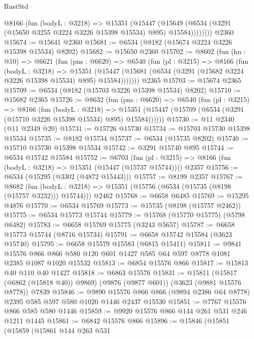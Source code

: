 \begin{lexlean}{RustStd}
\begin{coremodule}
          @8166
            (fun (bodyL : @3218) =>
            @15351
              (@15447
                (@15649 (@6534 (@3291 (@15650 @3255 @3224 @3226 @15398 @15534) @895) @15584))))))))
    @2360
@15674 := @15641 @2360
@15681 := @6534 (@8182 (@15674 @3224 @3226 @15398 @15534) @8202)
@15682 := @15650 @2360
@15702 := @8602
    (fun (hn : @10) =>
    @6621
      (fun (pns : @6620) =>
      @6540
        (fun (pl : @3215) =>
        @8166
          (fun (bodyL : @3218) =>
          @15351
            (@15447 (@15681 (@6534 (@3291 (@15682 @3224 @3226 @15398 @15534) @895) @15584)))))))
    @2365
@15703 := @15674 @2365
@15709 := @6534 (@8182 (@15703 @3226 @15398 @15534) @8202)
@15710 := @15682 @2365
@15726 := @8632
    (fun (pns : @6620) =>
    @6540
      (fun (pl : @3215) =>
      @8166
        (fun (bodyL : @3218) =>
        @15351 (@15447 (@15709 (@6534 (@3291 (@15710 @3226 @15398 @15534) @895) @15584))))))
@15730 := @11 @2340 (@11 @2349 @20)
@15731 := @15726 @15730
@15734 := @15703 @15730 @15398 @15534
@15735 := @8182 @15734
@15737 := @6534 (@15735 @8202)
@15740 := @15710 @15730 @15398 @15534
@15742 := @3291 @15740 @895
@15744 := @6534 @15742 @15584
@15752 := @6703
    (fun (pl : @3215) => @8166 (fun (bodyL : @3218) => @15351 (@15447 (@15737 @15744))))
    @2357
@15756 := @6534 (@15295 (@3302 (@4872 @15443)))
@15757 := @8199 @2357
@15767 := @8682
    (fun (bodyL : @3218) => @15351 (@15756 (@6534 (@15735 (@8198 (@15757 @3232))) @15744)))
    @2462
@15768 := @6658 @6485
@15769 := @15295 @4876
@15770 := @6534 @15769
@15773 := @15735 (@8198 (@15757 @2462))
@15775 := @6534 @15773 @15744
@15779 := @15768 (@15770 @15775) (@5798 @6482)
@15783 := @6658 @15769 @15775 (@3243 @5657)
@15787 := @6658 @15773 @15744 (@8716 @15734)
@15791 := @6658 @15742 @15584 (@3623 @15740)
@15795 := @6658 @15579 @15583 (@6815 @15411)
@15811 := @9841
    @15576
    @866
    @866
    @580
    @120
    @601
    @1427
    @585
    @64
    @597
    @8778
    @1081
    @2385
    @1087
    @1020
    @15532
@15813 := @6854 @15576 @866
@15817 := @15813 @40 @110 @40 @1427
@15818 := @6863 @15576
@15831 := @15811
    (@15817 (@6862 (@15818 @40)) @9869)
    (@9876 (@9877 @601))
    (@3623 (@9881 @15576 @8778))
    @7839
@15846 := @9890
    @15576
    @866
    @866
    (@9894 @2386 @64 @8778)
    @2395
    @585
    @597
    @580
    @1020
    @1446
    @2437
    @15530
@15851 := @7767 @15576 @866 @585 @580 @1446
@15859 := @9920 @15576 @866 @144 @261 @531 @246 @1211 @1445
@15861 := @6842 @15576 @866
@15896 := @15846
    (@15851
      (@15859
        (@15861
          @144
          @263
          @531

\end{coremodule}
\end{lexlean}
